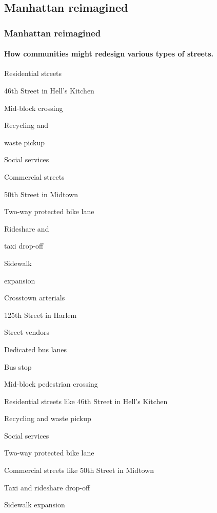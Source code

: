 \hypertarget{manhattan-reimagined}{%
\subsection{Manhattan reimagined}\label{manhattan-reimagined}}

\hypertarget{manhattan-reimagined-1}{%
\subsubsection{Manhattan reimagined}\label{manhattan-reimagined-1}}

\hypertarget{how-communities-might-redesign-various-types-of-streets}{%
\paragraph{How communities might redesign various types of
streets.}\label{how-communities-might-redesign-various-types-of-streets}}

Residential streets

46th Street in Hell's Kitchen

Mid-block crossing

Recycling and

waste pickup

Social services

Commercial streets

50th Street in Midtown

Two-way protected bike lane

Rideshare and

taxi drop-off

Sidewalk

expansion

Crosstown arterials

125th Street in Harlem

Street vendors

Dedicated bus lanes

Bus stop

Mid-block pedestrian crossing

Residential streets like 46th Street in Hell's Kitchen

Recycling and waste pickup

Social services

Two-way protected bike lane

Commercial streets like 50th Street in Midtown

Taxi and rideshare drop-off

Sidewalk expansion

